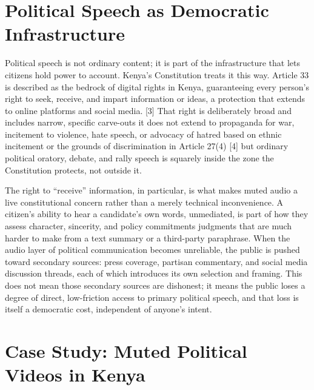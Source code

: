 \documentclass{article}
\begin{document}
\section{Political Speech as Democratic Infrastructure}
\par 
Political speech is not ordinary content; it is part of the infrastructure that lets citizens hold power to account. Kenya’s Constitution treats it this way. Article 33 is described as the bedrock of digital rights in Kenya, guaranteeing every person’s right to seek, receive, and impart information or ideas, a protection that extends to online platforms and social media. [3] That right is deliberately broad and includes narrow, specific carve-outs it does not extend to propaganda for war, incitement to violence, hate speech, or advocacy of hatred based on ethnic incitement or the grounds of discrimination in Article 27(4) [4]  but ordinary political oratory, debate, and rally speech is squarely inside the zone the Constitution protects, not outside it.
\par 
The right to “receive” information, in particular, is what makes muted audio a live constitutional concern rather than a merely technical inconvenience. A citizen’s ability to hear a candidate’s own words, unmediated, is part of how they assess character, sincerity, and policy commitments judgments that are much harder to make from a text summary or a third-party paraphrase. When the audio layer of political communication becomes unreliable, the public is pushed toward secondary sources: press coverage, partisan commentary, and social media discussion threads, each of which introduces its own selection and framing. This does not mean those secondary sources are dishonest; it means the public loses a degree of direct, low-friction access to primary political speech, and that loss is itself a democratic cost, independent of anyone’s intent.

\section{Case Study: Muted Political Videos in Kenya}
\end{document}

